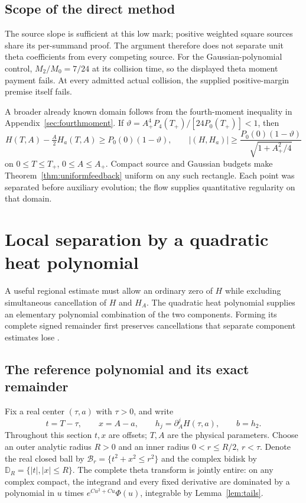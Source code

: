 \documentclass[11pt]{article}
\numberwithin{equation}{section}
\begin{document}
\subsection{Scope of the direct method}

The source slope is sufficient at this low mark; positive weighted
square sources share its per-summand proof. The argument therefore
does not separate unit theta coefficients from every competing source.
For the Gaussian-polynomial control,
$M_2/M_0=7/24$ at its collision time, so the displayed theta moment
payment fails. At every admitted actual collision, the supplied
positive-margin premise itself fails.

A broader already known domain follows from the fourth-moment
inequality in Appendix~\ref{sec:fourthmoment}. If
$\vartheta=A_+^4P_4(T_+)/[24P_0(T_+)]<1$, then
\begin{equation}\label{eq:carrierthetamargin}
 H(T,A)-\tfrac A2H_a(T,A)\ge P_0(0)(1-\vartheta),\qquad
 |(H,H_a)|\ge\frac{P_0(0)(1-\vartheta)}{\sqrt{1+A_+^2/4}}
\end{equation}
on $0\le T\le T_+$, $0\le A\le A_+$. Compact source and Gaussian
budgets make Theorem~\ref{thm:uniformfeedback} uniform on any such
rectangle. Each point was separated before auxiliary evolution;
the flow supplies quantitative regularity on that domain.


\section{Local separation by a quadratic heat polynomial}
\label{fcg:geometry}

A useful regional estimate must allow an ordinary zero of $H$ while
excluding simultaneous cancellation of $H$ and $H_A$. The quadratic
heat polynomial supplies an elementary polynomial combination of the
two components. Forming its complete signed remainder first preserves
cancellations that separate component estimates lose
\cite{FCGQuadratic,FCGAdaptive}.

\subsection{The reference polynomial and its exact remainder}

Fix a real center $(\tau,a)$ with $\tau>0$, and write
\[
 t=T-\tau,\qquad x=A-a,\qquad
 h_j=\partial_A^jH(\tau,a),\qquad b=h_2.
\]
Throughout this section $t,x$ are offsets; $T,A$ are the physical
parameters. Choose an outer analytic radius $R>0$ and an inner radius
$0<r\le R/2$, $r<\tau$. Denote the real closed ball by
$\mathcal B_r=\{t^2+x^2\le r^2\}$ and the complex bidisk by
$\mathbb D_R=\{|t|,|x|\le R\}$. The complete theta transform is jointly
entire: on any complex compact, the integrand and every fixed
derivative are dominated by a polynomial in $u$ times
$e^{C u^2+C u}\Phi(u)$, integrable by Lemma~\ref{lem:tails}.
\end{document}
